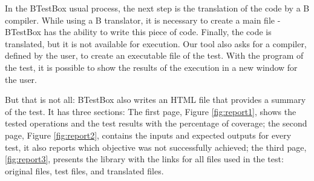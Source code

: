 \documentclass[runningheads]{llncs}
\begin{document}
In the BTestBox usual process, the next step is the translation of the code by a B compiler. While using a B translator, it is necessary to create a main file - BTestBox has the ability to write this piece of code. Finally, the code is translated, but it is not available for execution. Our tool also asks for a compiler, defined by the user, to create an executable file of the test. With the program of the test, it is possible to show the results of the execution in a new window for the user.

But that is not all: BTestBox also writes an HTML file that provides a summary of the test. It has three sections: The first page, Figure \ref{fig:report1}, shows the tested operations and the test results with the percentage of coverage; the second page, Figure \ref{fig:report2}, contains the inputs and expected outputs for every test, it also reports which objective was not successfully achieved; the third page, \ref{fig:report3}, presents the library with the links for all files used in the test: original files, test files, and translated files. 
\end{document}
